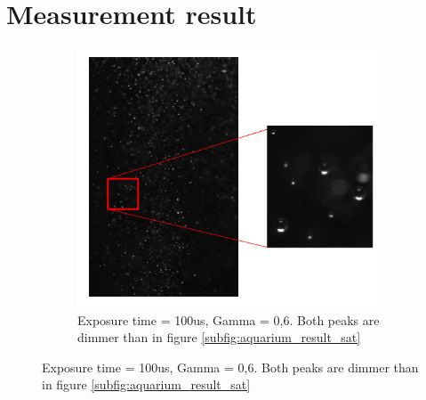 		
		
	\section{Measurement result}\label{measurement_result}
		\begin{figure}			
			\begin{subfigure}[b]{.55\textwidth}
				\centering
				\includegraphics[scale=0.8]{images/aquarium_result_sat.png}
				\caption{Exposure time = 100us, Gamma = 0,6. Both peaks are dimmer than in figure \ref{subfig:aquarium_result_sat}}
			\end{subfigure}
			

\end{figure}
